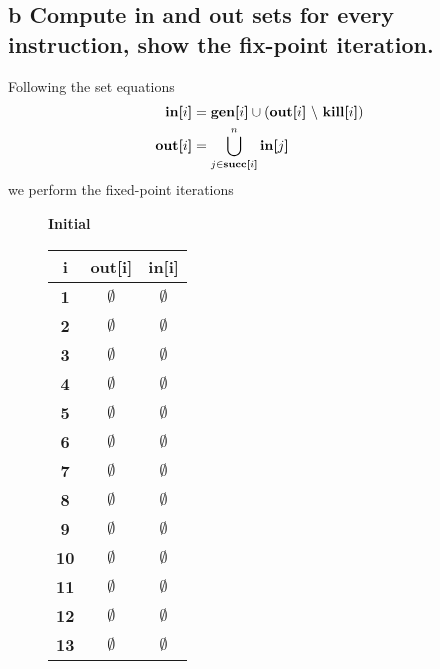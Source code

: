 \documentclass[11pt,a4paper]{article}
\begin{document}
\newpage
\subsection*{b \mdseries Compute {\bf in} and {\bf out} sets for every
instruction, show the fix-point iteration.}
Following the set equations
\begin{align}
	\text{\bf in[$i$]}
	&= \text{\bf gen[$i$]} \cup
	(\text{\bf out[$i$]}{\ }\backslash{\ }\text{\bf kill[$i$]} ) \\
	\text{\bf out[$i$]}
	&= \bigcup_{j \in \text{\bf succ[$i$]}}^n \text{\bf in[$j$]}
\end{align}
we perform the fixed-point iterations
\begin{figure}[H]

	\center
	\begin{multicols}{3}

		{\bf Initial} \\\vspace{0.10in}
		\begin{tabular}{|c||c|c|}
			\hline
			{\bf i}		& {\bf out[i]}		& {\bf in[i]}	\\ \hline
			{\bf 1}		& $\emptyset$		& $\emptyset$	\\ \hline
			{\bf 2}		& $\emptyset$		& $\emptyset$	\\ \hline
			{\bf 3}		& $\emptyset$		& $\emptyset$	\\ \hline
			{\bf 4}		& $\emptyset$		& $\emptyset$	\\ \hline
			{\bf 5}		& $\emptyset$		& $\emptyset$	\\ \hline
			{\bf 6}		& $\emptyset$		& $\emptyset$	\\ \hline
			{\bf 7}		& $\emptyset$		& $\emptyset$	\\ \hline
			{\bf 8}		& $\emptyset$		& $\emptyset$	\\ \hline
			{\bf 9}		& $\emptyset$		& $\emptyset$	\\ \hline
			{\bf 10}	& $\emptyset$		& $\emptyset$	\\ \hline
			{\bf 11}	& $\emptyset$		& $\emptyset$	\\ \hline
			{\bf 12}	& $\emptyset$		& $\emptyset$	\\ \hline
			{\bf 13}	& $\emptyset$		& $\emptyset$	\\ \hline
		\end{tabular}

		\vfill
		\columnbreak
			

\end{multicols}
\end{figure}
\end{document}
